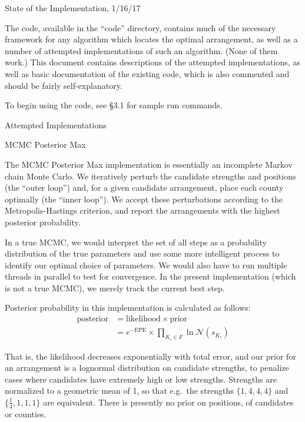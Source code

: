 \documentclass{article}
\newcommand{\noi}{\noindent}
\begin{document}
\begin{section}{State of the Implementation, 1/16/17}

The code, available in the ``code'' directory, contains much of the necessary framework for any algorithm which locates the optimal arrangement, as well as a number of attempted implementations of such an algorithm. (None of them work.) This document contains descriptions of the attempted implementations, as well as basic documentation of the existing code, which is also commented and should be fairly self-explanatory.

To begin using the code, see \S 3.1 for sample run commands.

\end{section}

\begin{section}{Attempted Implementations}

\begin{subsection}{MCMC Posterior Max}

The MCMC Posterior Max implementation is essentially an incomplete Markov chain Monte Carlo. We iteratively perturb the candidate strengths and positions (the ``outer loop'') and, for a given candidate arrangement, place each county optimally (the ``inner loop''). We accept these perturbations according to the Metropolis-Hastings criterion, and report the arrangements with the highest posterior probability.

In a true MCMC, we would interpret the set of all steps as a probability distribution of the true parameters and use some more intelligent process to identify our optimal choice of parameters. We would also have to run multiple threads in parallel to test for convergence. In the present implementation (which is not a true MCMC), we merely track the current best step.

Posterior probability in this implementation is calculated as follows:
\begin{align}
\text{posterior} &= \text{likelihood} \times \text{prior} \\
&= e^{-\text{EPE}} \times \prod_{K_i \in F} \ln \mathcal{N}(s_{K_i})
\end{align}

\noi That is, the likelihood decreases exponentially with total error, and our prior for an arrangement is a lognormal distribution on candidate strengths, to penalize cases where candidates have extremely high or low strengths. Strengths are normalized to a geometric mean of 1, so that e.g.\ the strengths $\{1,4,4,4\}$ and $\{\frac{1}{4},1,1,1\}$ are equivalent. There is presently no prior on positions, of candidates or counties.


\end{subsection}
\end{section}
\end{document}
